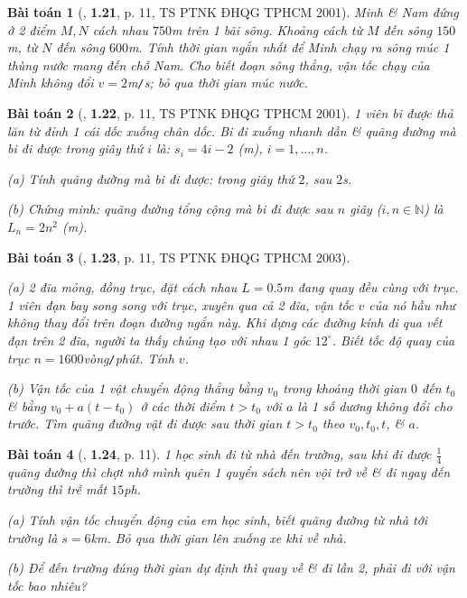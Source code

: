 \documentclass{article}
\numberwithin{equation}{section}
\newtheorem{baitoan}{Bài toán}[section]
\begin{document}
\begin{baitoan}[\cite{Van2022}, \textbf{1.21}, p. 11, TS PTNK ĐHQG TPHCM 2001]
	Minh \& Nam đứng ở 2 điểm $M,N$ cách nhau $750$\emph{m} trên 1 bãi sông. Khoảng cách từ $M$ đến sông $150$\emph{m}, từ $N$ đến sông $600$\emph{m}. Tính thời gian ngắn nhất để Minh chạy ra sông múc 1 thùng nước mang đến chỗ Nam. Cho biết đoạn sông thẳng, vận tốc chạy của Minh không đổi $v = 2$\emph{m\texttt{/}s}; bỏ qua thời gian múc nước.
\end{baitoan}

\begin{baitoan}[\cite{Van2022}, \textbf{1.22}, p. 11, TS PTNK ĐHQG TPHCM 2001]
	1 viên bi được thả lăn từ đỉnh 1 cái dốc xuống chân dốc. Bi đi xuống nhanh dần \& quãng đường mà bi đi được trong giây thứ $i$ là: $s_i = 4i - 2$ \emph{(m)}, $i = 1,\ldots,n$.
	\begin{enumerate*}
		\item[(a)] Tính quãng đường mà bi đi được: trong giây thứ $2$, sau $2$\emph{s}.
		\item[(b)] Chứng minh: quãng đường tổng cộng mà bi đi được sau $n$ giây ($i,n\in\mathbb{N}$) là $L_n = 2n^2$ \emph{(m)}.
	\end{enumerate*}
\end{baitoan}

\begin{baitoan}[\cite{Van2022}, \textbf{1.23}, p. 11, TS PTNK ĐHQG TPHCM 2003]
	\begin{enumerate*}
		\item[(a)] 2 đĩa mỏng, đồng trục, đặt cách nhau $L = 0.5$\emph{m} đang quay đều cùng với trục. 1 viên đạn bay song song với trục, xuyên qua cả 2 đĩa, vận tốc $v$ của nó hầu như không thay đổi trên đoạn đường ngắn này. Khi dựng các đường kính đi qua vết đạn trên 2 đĩa, người ta thấy chúng tạo với nhau 1 góc $12^\circ$. Biết tốc độ quay của trục $n = 1600$\emph{vòng\texttt{/}phút}. Tính $v$.
		\item[(b)] Vận tốc của 1 vật chuyển động thẳng bằng $v_0$ trong khoảng thời gian $0$ đến $t_0$ \& bằng $v_0 + a(t - t_0)$ ở các thời điểm $t > t_0$ với $a$ là 1 số dương không đổi cho trước. Tìm quãng đường vật đi được sau thời gian $t > t_0$ theo $v_0,t_0,t$, \& $a$.
	\end{enumerate*}
\end{baitoan}

\begin{baitoan}[\cite{Van2022}, \textbf{1.24}, p. 11]
	1 học sinh đi từ nhà đến trường, sau khi đi được $\frac{1}{4}$ quãng đường thì chợt nhớ mình quên 1 quyển sách nên vội trở về \& đi ngay đến trường thì trễ mất $15$\emph{ph}.
	\begin{enumerate*}
		\item[(a)] Tính vận tốc chuyển động của em học sinh, biết quãng đường từ nhà tới trường là $s = 6$\emph{km}. Bỏ qua thời gian lên xuống xe khi về nhà.
		\item[(b)] Để đến trường đúng thời gian dự định thì quay về \& đi lần 2, phải đi với vận tốc bao nhiêu?
	\end{enumerate*}
\end{baitoan}
\end{document}
